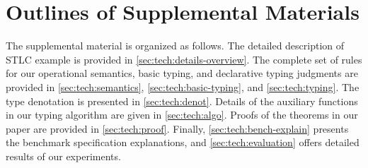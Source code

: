 \section{Outlines of Supplemental Materials}

The supplemental material is organized as follows. 
The detailed description of STLC example is provided in \autoref{sec:tech:details-overview}.
The complete set of rules for our operational semantics, basic typing, and declarative typing judgments are provided in \autoref{sec:tech:semantics}, \autoref{sec:tech:basic-typing}, and \autoref{sec:tech:typing}. The type denotation is presented in \autoref{sec:tech:denot}. Details of the auxiliary functions in our typing algorithm are given in \autoref{sec:tech:algo}. Proofs of the theorems in our paper are provided in \autoref{sec:tech:proof}. Finally, \autoref{sec:tech:bench-explain} presents the benchmark specification explanations, and \autoref{sec:tech:evaluation} offers detailed results of our experiments.